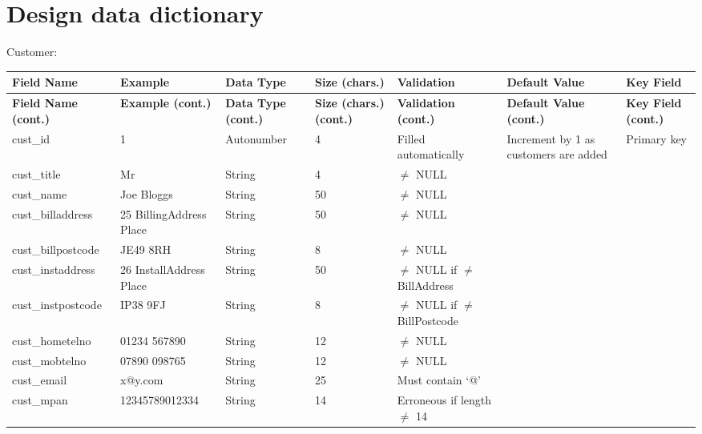 	\section{Design data dictionary}
Customer:
\begin{center}
	\begin{longtable}{ | p{3cm} | p{3cm} | p{2cm} | p{1cm} | p{2cm} | p{2cm} | p{2cm} | }
		\hline
		\textbf{Field Name} & \textbf{Example} & \textbf{Data Type}
& \textbf{Size (chars.)} & \textbf{Validation} & \textbf{Default Value} & \textbf{Key Field}\\
		\endfirsthead
		\hline
		\textbf{Field Name (cont.)} & \textbf{Example (cont.)} &
\textbf{Data Type (cont.)} & \textbf{Size (chars.) (cont.)} & \textbf{Validation (cont.)} & \textbf{Default Value (cont.)} & \textbf{Key Field (cont.)}\\
		\endhead
		\hline
		cust\_id & 1 & Autonumber & 4 & Filled automatically & Increment by 1 as customers are added & Primary key\\
		\hline
		cust\_title & Mr & String & 4 & $\neq$ NULL & &\\
		\hline
		cust\_name & Joe Bloggs & String & 50 & $\neq$ NULL & &\\
		\hline
		cust\_billaddress & 25 BillingAddress Place & String & 50 & $\neq$ NULL & &\\
		\hline
		cust\_billpostcode & JE49 8RH & String & 8 & $\neq$ NULL & &\\
		\hline
		cust\_instaddress & 26 InstallAddress Place & String & 50 & $\neq$ NULL if $\neq$ BillAddress & &\\
		\hline
		cust\_instpostcode & IP38 9FJ & String & 8 & $\neq$ NULL if $\neq$ BillPostcode & &\\
		\hline
		cust\_hometelno & 01234 567890 & String & 12 & $\neq$ NULL & &\\
		\hline
		cust\_mobtelno & 07890 098765 & String & 12 & $\neq$ NULL & &\\
		\hline
		cust\_email & x@y.com & String & 25 & Must contain `@' & &\\
		\hline
		cust\_mpan & 12345789012334 & String & 14 & Erroneous if length $\neq$ 14 & &\\
		\hline
	\end{longtable}
\end{center}

